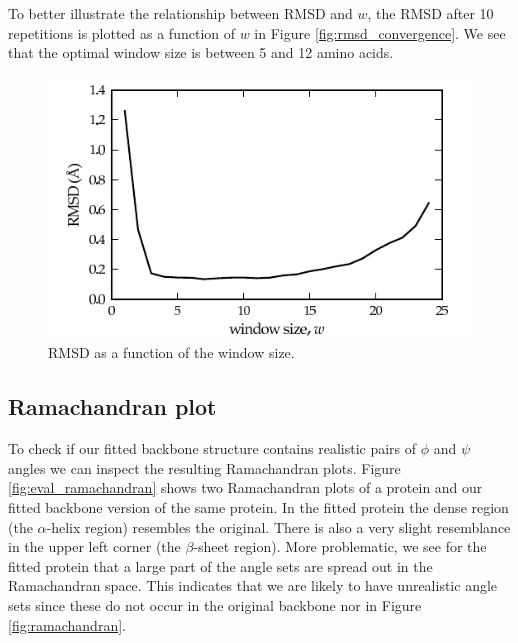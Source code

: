 To better illustrate the relationship between RMSD and $w$, the RMSD after 10 repetitions is plotted as a function of $w$ in Figure \ref{fig:rmsd_convergence}.
We see that the optimal window size is between 5 and 12 amino acids.
\begin{figure}
	\centering
	\hspace*{-3.5mm}\includegraphics[width=1.1\columnwidth]{figures/plot_rmsd}
	\caption{RMSD as a function of the window size.}
	\label{fig:rmsd_windowsize}
\end{figure}



\subsection{Ramachandran plot}
To check if our fitted backbone structure contains realistic pairs of $\phi$ and $\psi$ angles we can inspect the resulting Ramachandran plots.
Figure \ref{fig:eval_ramachandran} shows two Ramachandran plots of a protein and our fitted backbone version of the same protein.
In the fitted protein the dense region (the $\alpha$-helix region) resembles the original.
There is also a very slight resemblance in the upper left corner (the $\beta$-sheet region).
More problematic, we see for the fitted protein that a large part of the angle sets are spread out in the Ramachandran space.
This indicates that we are likely to have unrealistic angle sets since these do not occur in the original backbone nor in Figure \ref{fig:ramachandran}.

